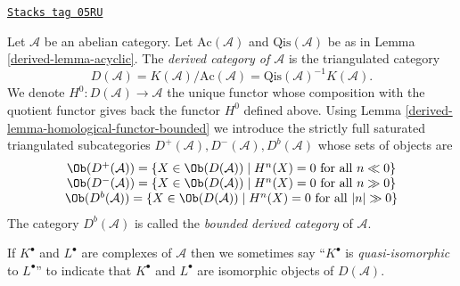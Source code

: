 \begin{definition}
\label{derived-definition-unbounded-derived-category}
\href{https://stacks.math.columbia.edu/tag/05RU}{\texttt{Stacks tag 05RU}}

Let $\mathcal{A}$ be an abelian category.
Let $\text{Ac}(\mathcal{A})$ and $\text{Qis}(\mathcal{A})$
be as in
Lemma \ref{derived-lemma-acyclic}.
The {\it derived category of $\mathcal{A}$} is the triangulated
category
$$
D(\mathcal{A}) =
K(\mathcal{A})/\text{Ac}(\mathcal{A}) =
\text{Qis}(\mathcal{A})^{-1} K(\mathcal{A}).
$$
We denote $H^0 : D(\mathcal{A}) \to \mathcal{A}$ the unique functor
whose composition with the quotient functor gives back the functor
$H^0$ defined above. Using
Lemma \ref{derived-lemma-homological-functor-bounded}
we introduce the strictly full saturated triangulated subcategories
$D^{+}(\mathcal{A}), D^{-}(\mathcal{A}), D^b(\mathcal{A})$
whose sets of objects are
$$
\begin{matrix}
\Ob(D^{+}(\mathcal{A})) =
\{X \in \Ob(D(\mathcal{A})) \mid
H^n(X) = 0\text{ for all }n \ll 0\} \\
\Ob(D^{-}(\mathcal{A})) =
\{X \in \Ob(D(\mathcal{A})) \mid
H^n(X) = 0\text{ for all }n \gg 0\} \\
\Ob(D^b(\mathcal{A})) =
\{X \in \Ob(D(\mathcal{A})) \mid
H^n(X) = 0\text{ for all }|n| \gg 0\}
\end{matrix}
$$
The category $D^b(\mathcal{A})$ is called the {\it bounded derived
category} of $\mathcal{A}$.
\end{definition}

If $K^\bullet$ and $L^\bullet$ are complexes of $\mathcal{A}$
then we sometimes say ``$K^\bullet$ is {\it quasi-isomorphic} to
$L^\bullet$'' to indicate that $K^\bullet$ and $L^\bullet$ are
isomorphic objects of $D(\mathcal{A})$.


